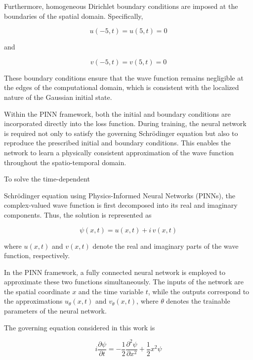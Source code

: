 \documentclass[11pt]{article}
\begin{document}
Furthermore, homogeneous Dirichlet boundary conditions are 
imposed at the boundaries of the spatial domain. 
Specifically,

\begin{equation}
	u(-5,t)=u(5,t)=0
\end{equation}

and

\begin{equation}
	v(-5,t)=v(5,t)=0
\end{equation}


These boundary conditions ensure that the wave function 
remains negligible at the edges of the computational domain, 
which is consistent with the localized nature of the 
Gaussian initial state.

Within the PINN framework, 
both the initial and boundary conditions are 
incorporated directly into the loss function. 
During training, the neural network is required not 
only to satisfy the governing Schrödinger equation but 
also to reproduce the prescribed initial and boundary 
conditions. This enables the network to learn a physically 
consistent approximation of the wave function throughout 
the spatio-temporal domain.



To solve the time-dependent 


Schrödinger equation using Physics-Informed 
Neural Networks (PINNs), 
the complex-valued wave function is first decomposed into its real and imaginary components. 
Thus, the solution is represented as

\begin{equation}
	\psi(x,t)=u(x,t)+i\,v(x,t)
\end{equation}

where $u(x,t)$ and $v(x,t)$ denote the real and imaginary parts of the wave function, respectively.

In the PINN framework, a fully connected neural network is employed to approximate these two functions simultaneously. The inputs of the network are the spatial coordinate $x$ and the time variable $t$, while the outputs correspond to the approximations $u_\theta(x,t)$ and $v_\theta(x,t)$, where $\theta$ denotes the trainable parameters of the neural network.

The governing equation considered in this work is

\begin{equation}
	i\frac{\partial \psi}{\partial t}
	=
	-\frac{1}{2}\frac{\partial^2\psi}{\partial x^2}
	+
	\frac{1}{2}x^2\psi
	\label{eq:schrodinger}
\end{equation}
\end{document}
